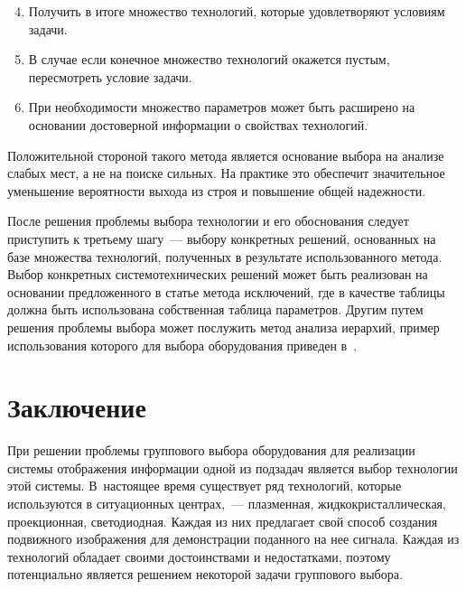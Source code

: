 \vspace*{18pt}

\begin{multicols}{2}

\noindent
\begin{enumerate}
\setcounter{enumi}{3}
\item Получить в итоге множество технологий, которые удовлетворяют 
условиям задачи. 
\item В случае если конечное множество технологий окажется пустым, 
пересмотреть условие задачи. 
\item При необходимости множество параметров может быть расширено на 
основании достоверной информации о свойствах технологий. 
\end{enumerate}
   
   Положительной стороной такого метода является основание выбора на 
анализе слабых мест, а не на поиске сильных. На практике это обеспечит 
значительное уменьшение вероятности выхода из строя и повышение общей 
надежности. 
   
   После решения проблемы выбора технологии и его обоснования следует 
приступить к третьему шагу~--- выбору конкретных решений, основанных на 
базе множества технологий, полученных в результате использованного 
метода. Выбор конкретных сис\-те\-мо\-тех\-ни\-че\-ских решений может быть 
реализован на основании предложенного в статье метода исключений, где в 
качестве таблицы должна быть использована собственная таб\-ли\-ца 
па\-ра\-мет\-ров. Другим путем решения проблемы выбора может послужить 
метод анализа иерархий, пример использования которого для выбора 
оборудования приведен в~\cite{18chu}.

\section{Заключение}

     При решении проблемы группового выбора обору\-до\-ва\-ния для 
реализации системы отображения информации одной из подзадач является 
выбор технологии этой системы. В~настоящее время существует ряд 
технологий, которые используются в ситуационных центрах,~--- плазменная, 
жид\-ко\-крис\-тал\-ли\-че\-ская, проекционная, светодиодная. Каж\-дая из них 
предлагает свой способ создания подвижного изображения для демонстрации 
поданного на нее сигнала. Каждая из технологий обладает своими 
достоинствами и недостатками, поэтому потенциально является решением 
некоторой задачи группового выбора. 
     

\end{multicols}
